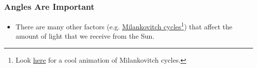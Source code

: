 \def\fn{\footnote{\tiny Look \href{http://www.wwnorton.com/college/geo/egeo2/content/animations/18_2.htm}{here} for a cool animation of Milankovitch cycles.}}
\begin{frame}
\frametitle{Angles Are Important}

\begin{itemize}
\item There are many other factors (e.g. \href{https://en.wikipedia.org/wiki/Milankovitch_cycles}{Milankovitch cycles}\fn) that affect the amount of light that we receive from the Sun.
\end{itemize}
\end{frame}
%

